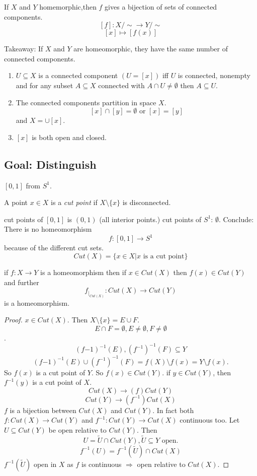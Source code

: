 \begin{lemma}
  If $X$ and $Y$ homemorphic,then $f$ gives a bijection of sets of connected components.
    $$[f]: X/\sim \to Y/\sim $$
    $$[x]\mapsto [f(x)]$$
\end{lemma}
Takeaway: If $X$ and $Y$ are homeomorphic, they have the same number of connected components.

\begin{proposition}
  \begin{enumerate}[(1)]
    \item  $U\subseteq X$ is a connected component $\left(U=[x]\right)$ iff $U$ is connected, nonempty and for any subset $A\subseteq X$ connected with $A\cap U\neq \emptyset$ then $A\subseteq U$.
    \item The connected components partition in space $X$.
      $$[x]\cap [y] = \emptyset \text{ or } [x]=[y]$$
      and $X=\cup[x]$.
    \item $[x]$ is both open and closed.
  \end{enumerate}
\end{proposition}
\subsection*{Goal: Distinguish}
$[0,1]$ from $S^1$.
\begin{definition}
  A point $x\in X$ is a \emph{cut point} if $X\setminus \{x\}$ is disconnected.
\end{definition}
cut points of $[0,1]$ is $(0,1)$ (all interior points.)
\newline
cut points of $S^1$: $\emptyset$.
\newline
Conclude: There is no homeomorphism
  $$f:[0,1]\to S^1$$
because of the different cut sets.
$$Cut(X)=\{x\in X | x \text{ is a cut point}\}$$
\begin{theorem}
  if $f:X\to Y$ is a homeomorphism then if $x\in Cut(X)$ then $f(x)\in Cut(Y)$ and further
    $$f_{\rvert_{Cut(X)}}:Cut(X)\to Cut(Y)$$
  is a homeomorphism.
\end{theorem}
\begin{proof}
  $x\in Cut(X)$. Then $X\setminus \{x\}=E\cup F$.
  $$E\cap F = \emptyset, E\neq \emptyset, F\neq \emptyset$$.
  $$(f{-1})^{-1}(E), (f^{-1})^{-1}(F) \subseteq Y$$
  $$(f{-1})^{-1}(E) \cup (f^{-1})^{-1}(F) = f(X)\setminus f(x)=Y\setminus f(x).$$
  So $f(x)$ is a cut point of $Y$. So $f(x)\in Cut(Y)$. if $y\in Cut(Y)$, then $f^{-1}(y)$ is a cut point of $X$.
    $$Cut(X)\to(f) Cut(Y)$$
    $$Cut(Y)\to (f^{-1})Cut(X)$$
  $f$ is a bijection between $Cut(X)$ and $Cut(Y)$. In fact both $f:Cut(X)\to Cut(Y)$ and $f^{-1}:Cut(Y)\to Cut(X)$ continuous too.
  Let $U\subseteq Cut(Y)$ be open relative to $Cut(Y)$. Then
    $$U=\tilde{U}\cap Cut(Y), \tilde{U}\subseteq Y \text{ open.}$$
    $$f^{-1}(U)=f^{-1}(\tilde{U})\cap Cut(X)$$
    $f^{-1}(\tilde{U})$ open in $X$ as $f$ is continuous $\Rightarrow $ open relative to $Cut(X)$.
\end{proof}

